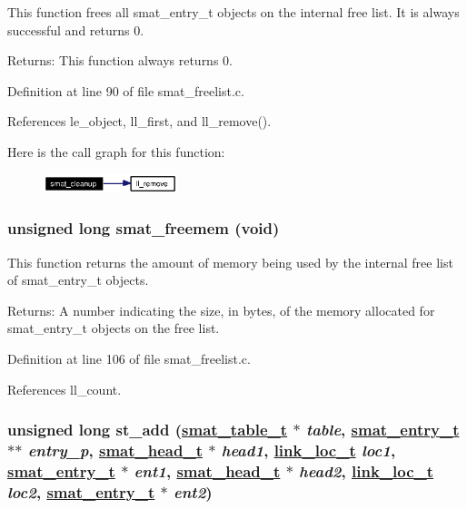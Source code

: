This function frees all smat\_\-entry\_\-t objects on the internal free list. It is always successful and returns 0.

\begin{Desc}
\item[Returns:]This function always returns 0.\end{Desc}


Definition at line 90 of file smat\_\-freelist.c.

References le\_\-object, ll\_\-first, and ll\_\-remove().

Here is the call graph for this function:\begin{figure}[H]
\begin{center}
\leavevmode
\includegraphics[width=110pt]{group__dbprim__smat_ga8_cgraph}
\end{center}
\end{figure}
\hypertarget{group__dbprim__smat_ga9}{
\subsubsection[smat\_\-freemem]{\setlength{\rightskip}{0pt plus 5cm}unsigned long smat\_\-freemem (void)}}
\label{group__dbprim__smat_ga9}


This function returns the amount of memory being used by the internal free list of smat\_\-entry\_\-t objects.

\begin{Desc}
\item[Returns:]A number indicating the size, in bytes, of the memory allocated for smat\_\-entry\_\-t objects on the free list.\end{Desc}


Definition at line 106 of file smat\_\-freelist.c.

References ll\_\-count.\hypertarget{group__dbprim__smat_ga13}{
\subsubsection[st\_\-add]{\setlength{\rightskip}{0pt plus 5cm}unsigned long st\_\-add (\hyperlink{struct__smat__table__s}{smat\_\-table\_\-t} $\ast$ {\em table}, \hyperlink{struct__smat__entry__s}{smat\_\-entry\_\-t} $\ast$$\ast$ {\em entry\_\-p}, \hyperlink{struct__smat__head__s}{smat\_\-head\_\-t} $\ast$ {\em head1}, \hyperlink{group__dbprim__link_ga4}{link\_\-loc\_\-t} {\em loc1}, \hyperlink{struct__smat__entry__s}{smat\_\-entry\_\-t} $\ast$ {\em ent1}, \hyperlink{struct__smat__head__s}{smat\_\-head\_\-t} $\ast$ {\em head2}, \hyperlink{group__dbprim__link_ga4}{link\_\-loc\_\-t} {\em loc2}, \hyperlink{struct__smat__entry__s}{smat\_\-entry\_\-t} $\ast$ {\em ent2})}}
\label{group__dbprim__smat_ga13}


